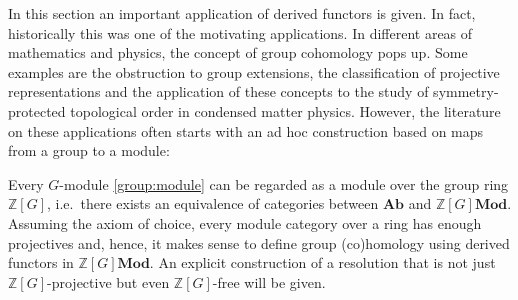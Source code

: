 	In this section an important application of derived functors is given. In fact, historically this was one of the motivating applications. In different areas of mathematics and physics, the concept of group cohomology pops up. Some examples are the obstruction to group extensions, the classification of projective representations and the application of these concepts to the study of symmetry-protected topological order in condensed matter physics. However, the literature on these applications often starts with an ad hoc construction based on maps from a group to a module:

    Every $G$-module \ref{group:module} can be regarded as a module over the group ring $\mathbb{Z}[G]$, i.e.~there exists an equivalence of categories between $\mathbf{Ab}$ and $\mathbb{Z}[G]\mathbf{Mod}$. Assuming the axiom of choice, every module category over a ring has enough projectives and, hence, it makes sense to define group (co)homology using derived functors in $\mathbb{Z}[G]\mathbf{Mod}$. An explicit construction of a resolution that is not just $\mathbb{Z}[G]$-projective but even $\mathbb{Z}[G]$-free will be given.

